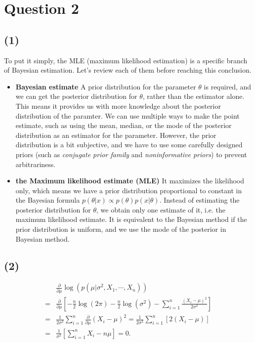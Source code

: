 \documentclass{article}
\begin{document}
\section*{Question 2}
{
    \subsection*{(1)}
    {
        To put it simply, the MLE (maximum likelihood estimation) is a specific branch of Bayesian estimation. Let's review each of them before reaching this conclusion.

        \begin{itemize}
            \item \textbf{Bayesian estimate} \quad A prior distribution for the parameter $\theta$ is required, and we can get the posterior distribution for $\theta$, rather than the estimator alone. This means it provides us with more knowledge about the posterior distribution of the paramter. We can use multiple ways to make the point estimate, such as using the mean, median, or the mode of the posterior distribution as an estimator for the parameter. However, the prior distribution is a bit subjective, and we have to use some carefully designed priors (such as \emph{conjugate prior family} and \emph{noninformative priors}) to prevent arbitrariness.

            \item \textbf{the Maximum likelihood estimate (MLE)} \quad It maximizes the likelihood only, which means we have a prior distribution proportional to constant in the Bayesian formula $p(\theta|x) \propto p(\theta)p(x|\theta)$. Instead of estimating the posterior distribution for $\theta$, we obtain only one estimate of it, i.e. the maximum likelihood estimate. It is equivalent to the Bayesian method if the prior distribution is uniform, and we use the mode of the posterior in Bayesian method. 

        \end{itemize}
    }

    \subsection*{(2)}
    {
        \[
        \begin{split}
                &   \frac{\partial}{\partial \mu} \log{(p(\mu | \sigma^2, X_1, \cdots, X_n))} \\
                =&  \frac{\partial}{\partial \mu} \left[ -\frac{n}{2} \log{(2\pi)} - \frac{n}{2} \log{(\sigma^2)} - \sum_{i=1}^{n} {\frac{(X_i - \mu)^2}{2\sigma^2}} \right] \\
                =&  \frac{1}{2\sigma^2} \sum_{i=1}^{n} {\frac{\partial}{\partial \mu} (X_i - \mu)^2} = \frac{1}{2\sigma^2} \sum_{i=1}^{n} {\left[ 2 (X_i - \mu) \right]} \\
                =&  \frac{1}{\sigma^2} \left[ \sum_{i=1}^{n} {X_i} - n \mu \right] = 0.
        \end{split}
        \]

}}
\end{document}
